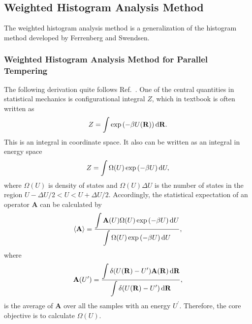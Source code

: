 \subsection{Weighted Histogram Analysis Method\label{Sec:FEM:WHAM}}
The weighted histogram analysis method is a generalization of the histogram method developed by Ferrenberg and Swendsen.\cite{FerrenbergPRL1989}
\subsubsection{Weighted Histogram Analysis Method for Parallel Tempering\label{Sec:FEM:WHAM_REMD}}
The following derivation quite follows Ref.~\cite{ChoderaJCTC2007}.
One of the central quantities in statistical mechanics is configurational integral $Z$, which in textbook is often written as
\begin{equation}
Z=\int \exp{(-\beta U(\mathbf{R}))}\mathop{}\!\mathrm{d}\mathbf{R}.
\end{equation}
This is an integral in coordinate space. It also can be written as an integral in energy space
\begin{equation}
Z=\int \Omega(U)\exp{(-\beta U)}\mathop{}\!\mathrm{d} U,
\end{equation}
where $\Omega(U)$ is density of states and $\Omega(U)\Delta U$ is the number of states in the region $U-\Delta U/2<U<U+\Delta U/2$. Accordingly, the statistical expectation of an operator $\mathbf{A}$ can be calculated by
\begin{equation}
\langle \mathbf{A}\rangle=\frac {\displaystyle\int \mathbf{A}(U)\Omega(U)\exp{(-\beta U)}\mathop{}\!\mathrm{d} U}{\displaystyle\int \Omega(U)\exp{(-\beta U)}\mathop{}\!\mathrm{d} U},
\end{equation}
where
\begin{equation}
\mathbf{A}(U^\prime)=\frac{\displaystyle\int \delta (U(\mathbf{R})-U^\prime)\mathbf{A}(\mathbf{R})\mathop{}\!\mathrm{d} \mathbf{R}}{\displaystyle\int \delta (U(\mathbf{R})-U^\prime)\mathop{}\!\mathrm{d}\mathbf{R}},
\end{equation}
is the average of $\mathbf{A}$ over all the samples with an energy $U^\prime$. Therefore, the core objective is to calculate $\Omega(U)$.

